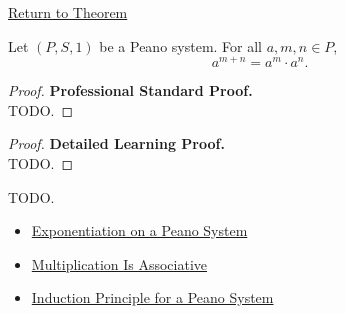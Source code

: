 \newpage
{}
\label{prf:exponent-sum-law}

\begin{remark*}[Return]
\hyperref[thm:exponent-sum-law]{Return to Theorem}
\end{remark*}

\begin{theorem*}
Let $(P,S,1)$ be a Peano system. For all $a,m,n \in P$,
\[
a^{m+n} = a^m \cdot a^n.
\]
\end{theorem*}

\begin{proof}
\textbf{Professional Standard Proof.}~\\
TODO.
\end{proof}

\begin{proof}
\textbf{Detailed Learning Proof.}~\\
TODO.
\end{proof}

\begin{remark*}
TODO.
\end{remark*}

\begin{dependencies}
\begin{itemize}
  \item \hyperref[def:exponentiation-on-peano-system]{Exponentiation on a Peano System}
  \item \hyperref[thm:multiplication-associative]{Multiplication Is Associative}
  \item \hyperref[thm:induction-principle-for-peano-system]{Induction Principle for a Peano System}
\end{itemize}
\end{dependencies}
